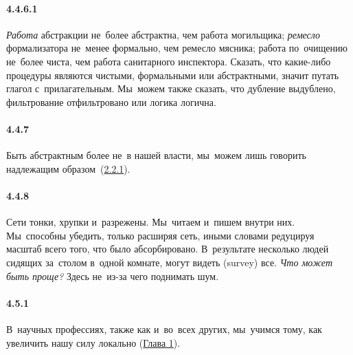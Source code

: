\paragraph{4.4.6.1}\hypertarget{par:4.4.6.1}{} {\itshape Работа} абстракции не~более абстрактна, чем работа могильщика; {\itshape ремесло} формализатора не~менее формально, чем ремесло мясника; работа по~очищению не~более чиста, чем работа санитарного инспектора. Сказать, что какие-либо процедуры являются чистыми, формальными или абстрактными, значит путать глагол с~прилагательным. Мы~можем также сказать, что дубление выдублено, фильтрование отфильтровано или логика логична.


\paragraph{4.4.7}\hypertarget{par:4.4.7}{} Быть абстрактным более не~в нашей власти, мы~можем лишь говорить надлежащим образом~(\hyperlink{par:2.2.1}{2.2.1}).


\paragraph{4.4.8}\hypertarget{par:4.4.8}{} Сети тонки, хрупки и~разрежены. Мы~читаем и~пишем внутри них. Мы~способны убедить, только расширяя сеть, иными словами редуцируя масштаб всего того, что было абсорбировано. В~результате несколько людей сидящих за~столом в~одной комнате, могут видеть (survey) все. {\itshape Что может быть проще? }Здесь не~из-за чего поднимать шум. 


\paragraph{4.5.1}\hypertarget{par:4.5.1}{} В~научных профессиях, также как и~во~всех других, мы~учимся тому, как увеличить нашу силу локально (\hyperlink{chap1}{Глава 1}).


